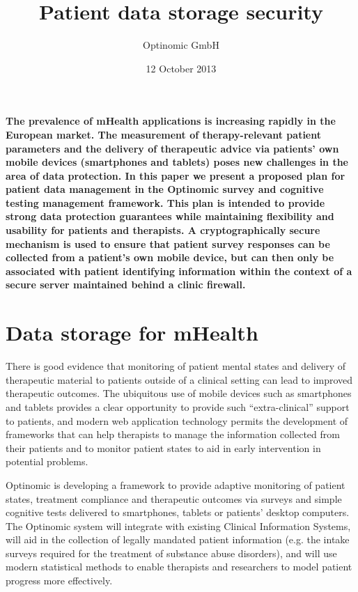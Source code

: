\documentclass[DIV=calc,paper=a4,fontsize=11pt,twocolumn]{scrartcl}
\title{Patient data storage security}
\author{Optinomic GmbH}
\date{12 October 2013}
\begin{document}
\maketitle

\thispagestyle{fancy}

{\setlength\parindent{0pt} \textbf{The prevalence of mHealth
    applications is increasing rapidly in the European market.  The
    measurement of therapy-relevant patient parameters and the
    delivery of therapeutic advice via patients' own mobile devices
    (smartphones and tablets) poses new challenges in the area of data
    protection.  In this paper we present a proposed plan for patient
    data management in the Optinomic survey and cognitive testing
    management framework.  This plan is intended to provide strong
    data protection guarantees while maintaining flexibility and
    usability for patients and therapists.  A cryptographically secure
    mechanism is used to ensure that patient survey responses can be
    collected from a patient's own mobile device, but can then only be
    associated with patient identifying information within the context
    of a secure server maintained behind a clinic firewall.}}

\section*{Data storage for mHealth}

There is good evidence that monitoring of patient mental states and
delivery of therapeutic material to patients outside of a clinical
setting can lead to improved therapeutic outcomes.  The ubiquitous use
of mobile devices such as smartphones and tablets provides a clear
opportunity to provide such ``extra-clinical'' support to patients,
and modern web application technology permits the development of
frameworks that can help therapists to manage the information
collected from their patients and to monitor patient states to aid in
early intervention in potential problems.

Optinomic is developing a framework to provide adaptive monitoring of
patient states, treatment compliance and therapeutic outcomes via
surveys and simple cognitive tests delivered to smartphones, tablets
or patients' desktop computers.  The Optinomic system will integrate
with existing Clinical Information Systems, will aid in the collection
of legally mandated patient information (e.g. the intake surveys
required for the treatment of substance abuse disorders), and will use
modern statistical methods to enable therapists and researchers to
model patient progress more effectively.
\end{document}
